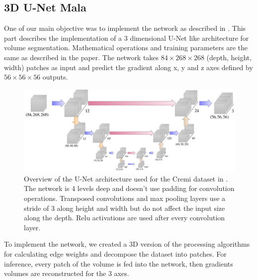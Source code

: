 \subsection{3D U-Net Mala}

One of our main objective was to implement the network as described in \cite{funke_large_2019}. This part describes the implementation of a 3 dimensional U-Net like architecture for volume segmentation. Mathematical operations and training parameters are the same as described in the paper. The network takes $84\times268\times268$ (depth, height, width) patches as input and predict the gradient along x, y and z axes defined by $56\times56\times56$ outputs.\\

\begin{figure}[!htbp]
	\centering
	\includegraphics[width=0.8\linewidth]{./images/mala_architecture.png}
	\caption{Overview of the U-Net architecture used for the Cremi dataset in \cite{funke_large_2019}. The network is 4 levels deep and doesn’t use padding for convolution operations. Transposed convolutions and max pooling layers use a stride of 3 along height and width but do not affect the input size along the depth. Relu activations are used after every convolution layer.}%
	\label{fig:mala_unet}
\end{figure}

To implement the network, we created a 3D version of the processing algorithms for calculating edge weights and decompose the dataset into patches. For inference, every patch of the volume is fed into the network, then gradients volumes are reconstructed for the 3 axes.


